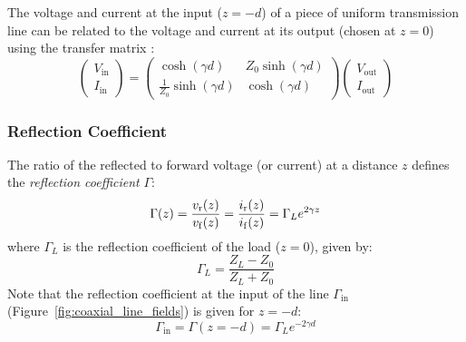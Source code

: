 The voltage and current at the input ($z=-d$) of a piece of uniform transmission line can be related to the voltage and current at its output (chosen at $z=0$) using the transfer matrix :
\begin{equation}
\left( 
\begin{array}{c}
	V_{\mathrm{in}} \\
	I_{\mathrm{in}}
\end{array}
\right)
=
\left( 
\begin{array}{cc}
\cosh  \left(\gamma d\right) & Z_0 \sinh \left(\gamma d \right) \\ 
\frac{1}{Z_0}\sinh \left( \gamma d\right) & \cosh\left(\gamma d\right) 
\end{array} 
\right)
\left( 
\begin{array}{c}
	V_{\mathrm{out}} \\
	I_{\mathrm{out}}
\end{array}
\right)
	\label{eq:voltage_current_transfer_matrix}
\end{equation}




\subsubsection{Reflection Coefficient}
The ratio of the reflected to forward voltage (or current) at a distance $z$ defines the \textit{reflection coefficient} $\Gamma$:
\begin{equation}
\Gamma(z) = \frac{{v_{\mathrm{r}}}(z)}{{v_{\mathrm{f}}}(z)} =  \frac{{i_{\mathrm{r}}}(z)}{{i_{\mathrm{f}}}(z)} = \Gamma_L e^{2\gamma z}
\label{eq:Gamma_at_z}
\end{equation}
where $\Gamma_L$ is the reflection coefficient of the load ($z=0$), given by:
\begin{equation}
	\Gamma_L = \frac{Z_L - Z_0}{Z_L + Z_0}
	\label{eq:Gamma_L}
\end{equation}
Note that the reflection coefficient at the input of the line $\Gamma_{\mathrm{in}}$ (Figure~\ref{fig:coaxial_line_fields}) is given for $z=-d$:
$$
\Gamma_{\mathrm{in}}=\Gamma(z=-d)=\Gamma_L e^{-2\gamma d}
$$

